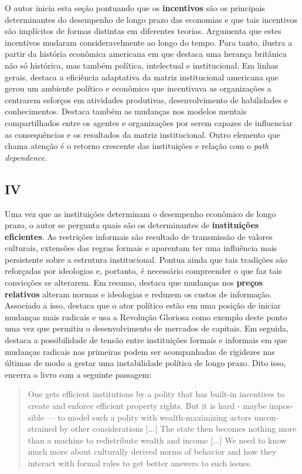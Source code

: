 O autor inicia esta seção pontuando que os \textbf{incentivos} são os principais determinantes do desempenho de longo prazo das economias e que tais incentivos são implícitos de formas distintas em diferentes teorias. Argumenta que estes incentivos mudaram consideravelmente ao longo do tempo. Para tanto, ilustra a partir da história econômica americana em que destaca uma herança britânica não só histórica, mas também política, intelectual e institucional. Em linhas gerais, destaca a eficiência adaptativa da matriz institucional americana que gerou um ambiente político e econômico que incentivava as organizações a centrarem esforços em atividades produtivas, desenvolvimento de habilidades e conhecimentos. Destaca também as mudanças nos modelos mentais compartilhados entre os agentes e organizações por serem capazes de influenciar as consequências e os resultados da matriz institucional. Outro elemento que chama atenção é o retorno crescente das instituições e relação com o \textit{path dependence}.

\subsection*{IV}

Uma vez que as instituições determinam o desempenho econômico de longo prazo, o autor se pergunta quais são os determinantes de \textbf{instituições eficientes}. As restrições informais são resultado de transmissão de valores culturais, extensões das regras formais e aparentam ter uma influência mais persistente sobre a estrutura institucional. Pontua ainda que tais tradições são reforçadas por ideologias e, portanto, é necessário compreender o que faz tais convicções se alterarem. Em resumo, destaca que mudanças nos \textbf{preços relativos} alteram normas e ideologias e reduzem os custos de informação. Associado a isso, destaca que o ator político estão em uma posição de iniciar mudanças mais radicais e usa a Revolução Gloriosa como exemplo deste ponto uma vez que permitiu o desenvolvimento de mercados de capitais. Em seguida, destaca a possibilidade de tensão entre instituições formais e informais em que mudanças radicais nas primeiras podem ser acompanhadas de rigidezes nas últimas de modo a gestar uma instabilidade política de longo prazo. Dito isso, encerra o livro com a seguinte passagem:

\begin{quotation}
	One gets efficient institutions by a polity that has built-in incentives to
	create and enforce efficient property rights. But it is hard - maybe impos­sible --- to model such a polity with wealth-maximizing actors uncon­strained by other considerations [...] The state then becomes nothing more than a machine to redistribute wealth	and income [...] We need to know much more about culturally derived norms of behavior and how they interact with formal rules to get better
	answers to such issues. 
\end{quotation}
